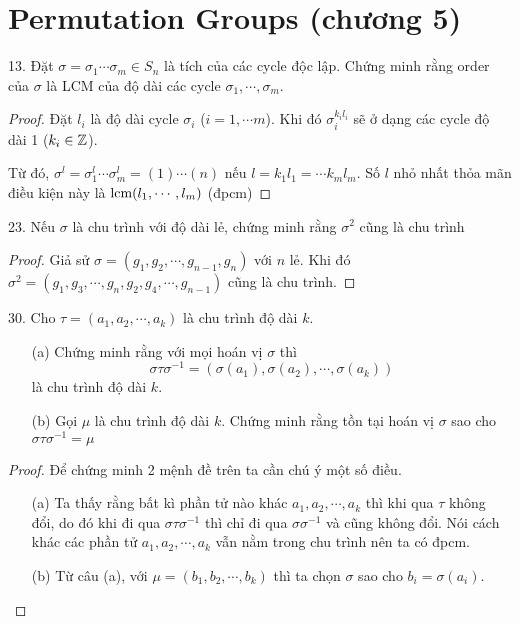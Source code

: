 \section{Permutation Groups (chương 5)}

13. Đặt $\sigma = \sigma_1 \cdots \sigma_m \in S_n$ là tích của các cycle độc lập. Chứng minh rằng order của $\sigma$ là LCM của độ dài các cycle $\sigma_1, \cdots, \sigma_m$.

\begin{proof}
    Đặt $l_i$ là độ dài cycle $\sigma_i$ ($i = 1, \cdots m$). Khi đó $\sigma_i^{k_i l_i}$ sẽ ở dạng các cycle độ dài 1 ($k_i \in \mathbb{Z}$).

    Từ đó, $\sigma^l = \sigma_1^l \cdots \sigma_m^l = (1)\cdots(n)$ nếu $l = k_1 l_1 = \cdots k_m l_m$. Số $l$ nhỏ nhất thỏa mãn điều kiện này là $\text{lcm}(l_1, \cdots, l_m)$ (đpcm)

\end{proof}

23. Nếu $\sigma$ là chu trình với độ dài lẻ, chứng minh rằng $\sigma^2$ cũng là chu trình
\begin{proof}
    Giả sử $\sigma = (g_1, g_2, \cdots, g_{n-1}, g_n)$ với $n$ lẻ. Khi đó $\sigma^2 = (g_1, g_3, \cdots, g_n, g_2, g_4, \cdots, g_{n-1})$ cũng là chu trình.
\end{proof}

30. Cho $\tau = (a_1, a_2, \cdots, a_k)$ là chu trình độ dài $k$.

\begin{enumerate}
    \item[(a)] Chứng minh rằng với mọi hoán vị $\sigma$ thì $$\sigma \tau \sigma^{-1} = (\sigma(a_1), \sigma(a_2), \cdots, \sigma(a_k))$$ là chu trình độ dài $k$.
    \item[(b)] Gọi $\mu$ là chu trình độ dài $k$. Chứng minh rằng tồn tại hoán vị $\sigma$ sao cho $\sigma \tau \sigma^{-1} = \mu$
\end{enumerate}

\begin{proof}
    Để chứng minh 2 mệnh đề trên ta cần chú ý một số điều.

    \begin{enumerate}
        \item [(a)] Ta thấy rằng bất kì phần tử nào khác $a_1, a_2, \cdots, a_k$ thì khi qua $\tau$ không đổi, do đó khi đi qua $\sigma \tau \sigma^{-1}$ thì chỉ đi qua $\sigma \sigma^{-1}$ và cũng không đổi. Nói cách khác các phần tử $a_1, a_2, \cdots, a_k$ vẫn nằm trong chu trình nên ta có đpcm.
        \item [(b)] Từ câu (a), với $\mu = (b_1, b_2, \cdots, b_k)$ thì ta chọn $\sigma$ sao cho $b_i = \sigma(a_i)$.
    \end{enumerate}    
\end{proof}
